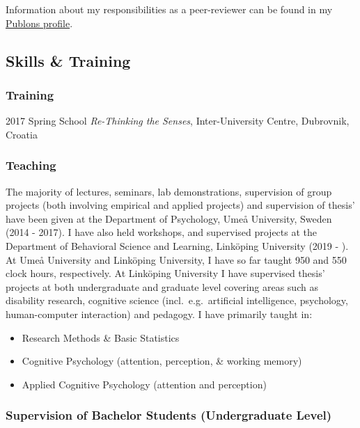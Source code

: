 \documentclass[]{article}
\providecommand{\tightlist}{%
  \setlength{\itemsep}{0pt}\setlength{\parskip}{0pt}}
\begin{document}
Information about my responsibilities as a peer-reviewer can be found in
my \href{https://www.publons.com/a/1517052/}{Publons profile}.

\hypertarget{skills-training}{%
\subsection{Skills \& Training}\label{skills-training}}

\hypertarget{training}{%
\subsubsection{Training}\label{training}}

2017 Spring School \emph{Re-Thinking the Senses}, Inter-University
Centre, Dubrovnik, Croatia

\hypertarget{teaching}{%
\subsubsection{Teaching}\label{teaching}}

The majority of lectures, seminars, lab demonstrations, supervision of
group projects (both involving empirical and applied projects) and
supervision of thesis' have been given at the Department of Psychology,
Umeå University, Sweden (2014 - 2017). I have also held workshops, and
supervised projects at the Department of Behavioral Science and
Learning, Linköping University (2019 - ). At Umeå University and
Linköping University, I have so far taught 950 and 550 clock hours,
respectively. At Linköping University I have supervised thesis' projects
at both undergraduate and graduate level covering areas such as
disability research, cognitive science (incl.~e.g.~artificial
intelligence, psychology, human-computer interaction) and pedagogy. I
have primarily taught in:

\begin{itemize}
\tightlist
\item
  Research Methods \& Basic Statistics
\item
  Cognitive Psychology (attention, perception, \& working memory)
\item
  Applied Cognitive Psychology (attention and perception)
\end{itemize}

\hypertarget{supervision-of-bachelor-students-undergraduate-level}{%
\subsubsection{Supervision of Bachelor Students (Undergraduate
Level)}\label{supervision-of-bachelor-students-undergraduate-level}}
\end{document}
